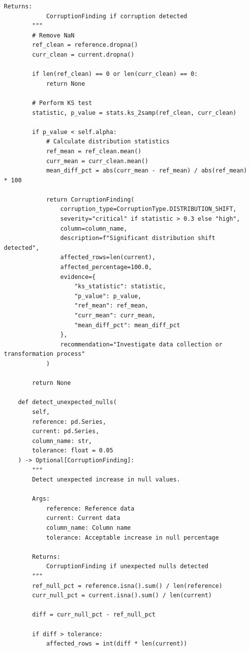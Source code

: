 \begin{lstlisting}[style=python, caption={Data corruption detection framework}]
        Returns:
            CorruptionFinding if corruption detected
        """
        # Remove NaN
        ref_clean = reference.dropna()
        curr_clean = current.dropna()

        if len(ref_clean) == 0 or len(curr_clean) == 0:
            return None

        # Perform KS test
        statistic, p_value = stats.ks_2samp(ref_clean, curr_clean)

        if p_value < self.alpha:
            # Calculate distribution statistics
            ref_mean = ref_clean.mean()
            curr_mean = curr_clean.mean()
            mean_diff_pct = abs(curr_mean - ref_mean) / abs(ref_mean) * 100

            return CorruptionFinding(
                corruption_type=CorruptionType.DISTRIBUTION_SHIFT,
                severity="critical" if statistic > 0.3 else "high",
                column=column_name,
                description=f"Significant distribution shift detected",
                affected_rows=len(current),
                affected_percentage=100.0,
                evidence={
                    "ks_statistic": statistic,
                    "p_value": p_value,
                    "ref_mean": ref_mean,
                    "curr_mean": curr_mean,
                    "mean_diff_pct": mean_diff_pct
                },
                recommendation="Investigate data collection or transformation process"
            )

        return None

    def detect_unexpected_nulls(
        self,
        reference: pd.Series,
        current: pd.Series,
        column_name: str,
        tolerance: float = 0.05
    ) -> Optional[CorruptionFinding]:
        """
        Detect unexpected increase in null values.

        Args:
            reference: Reference data
            current: Current data
            column_name: Column name
            tolerance: Acceptable increase in null percentage

        Returns:
            CorruptionFinding if unexpected nulls detected
        """
        ref_null_pct = reference.isna().sum() / len(reference)
        curr_null_pct = current.isna().sum() / len(current)

        diff = curr_null_pct - ref_null_pct

        if diff > tolerance:
            affected_rows = int(diff * len(current))


\end{lstlisting}
